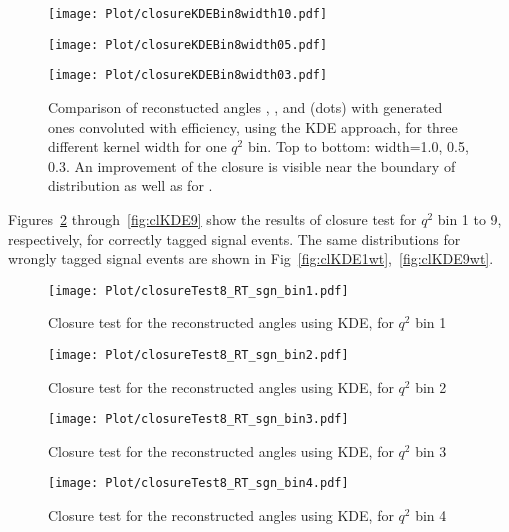 \begin{figure}[hbt]
    \texttt{[image: Plot/closureKDEBin8width10.pdf]}

    \texttt{[image: Plot/closureKDEBin8width05.pdf]}

    \texttt{[image: Plot/closureKDEBin8width03.pdf]}

    \caption{Comparison of reconstucted angles \TK, \TL, and \PHI (dots) with
        generated ones convoluted with efficiency, using the KDE approach, for
        three different kernel width for one $q^2$ bin. Top to bottom: width=1.0, 0.5, 0.3.
        An improvement of the closure is visible near the boundary of \cTK distribution as well as for \PHI.}
    \label{fig:clKDEwidthBin8}
\end{figure}

Figures~\ref{fig:clKDE1} through~\ref{fig:clKDE9} show the results of
closure test for $q^2$ bin 1 to 9, respectively, for correctly tagged
signal events.  The same distributions for wrongly tagged signal
events are shown in Fig~\ref{fig:clKDE1wt},~\ref{fig:clKDE9wt}.

\begin{figure}[hbt]
    \texttt{[image: Plot/closureTest8\_RT\_sgn\_bin1.pdf]}

    \caption{Closure test for the reconstructed angles using KDE, for $q^2$ bin 1}
    \label{fig:clKDE1}
\end{figure}

\begin{figure}[hbt]
    \texttt{[image: Plot/closureTest8\_RT\_sgn\_bin2.pdf]}

    \caption{Closure test for the reconstructed angles using KDE, for $q^2$ bin 2}
    \label{fig:clKDE2}
\end{figure}

\begin{figure}[hbt]
    \texttt{[image: Plot/closureTest8\_RT\_sgn\_bin3.pdf]}

    \caption{Closure test for the reconstructed angles using KDE, for $q^2$ bin 3}
    \label{fig:clKDE3}
\end{figure}

\begin{figure}[hbt]
    \texttt{[image: Plot/closureTest8\_RT\_sgn\_bin4.pdf]}

    \caption{Closure test for the reconstructed angles using KDE, for $q^2$ bin 4}
    \label{fig:clKDE4}
\end{figure}

